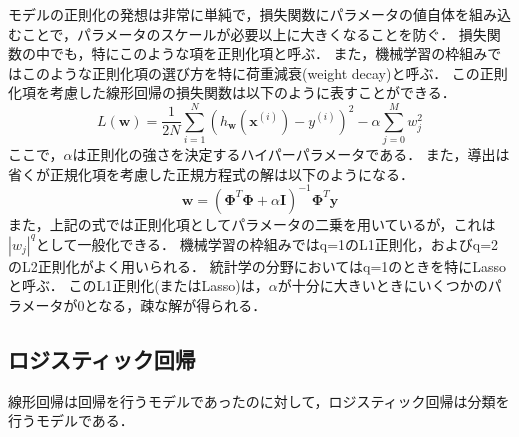     モデルの正則化の発想は非常に単純で，損失関数にパラメータの値自体を組み込むことで，パラメータのスケールが必要以上に大きくなることを防ぐ．
    損失関数の中でも，特にこのような項を正則化項と呼ぶ．
    また，機械学習の枠組みではこのような正則化項の選び方を特に荷重減衰(weight decay)と呼ぶ．
    この正則化項を考慮した線形回帰の損失関数は以下のように表すことができる．
    \begin{equation}
        L(\bm{w}) = \frac{1}{2N}\sum_{i=1}^{N}\left(h_{\bm{w}}(\bm{x}^{(i)})-y^{(i)}\right)^2-\alpha \sum^M_{j=0}w_{j}^2
    \end{equation}
    ここで，$\alpha$は正則化の強さを決定するハイパーパラメータである．
    また，導出は省くが正規化項を考慮した正規方程式の解は以下のようになる．
    \begin{equation}
        \bm{w}=\left( \bm{\Phi}^T\bm{\Phi}+\alpha \bm{I} \right)^{-1}\bm{\Phi}^T\bm{y}
    \end{equation}
    また，上記の式では正則化項としてパラメータの二乗を用いているが，これは$|w_j|^q$として一般化できる．
    機械学習の枠組みではq=1のL1正則化，およびq=2のL2正則化がよく用いられる．
    統計学の分野においてはq=1のときを特にLassoと呼ぶ\cite{tibshirani1996regression}．
    このL1正則化(またはLasso)は，$\alpha$が十分に大きいときにいくつかのパラメータが0となる，疎な解が得られる．
    
\subsection{ロジスティック回帰}
    線形回帰は回帰を行うモデルであったのに対して，ロジスティック回帰は分類を行うモデルである．
    
